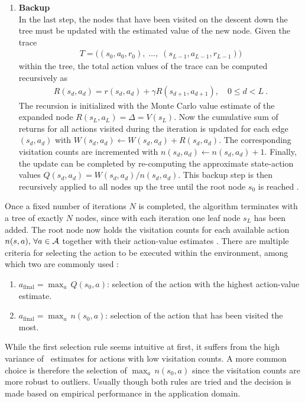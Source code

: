 \begin{enumerate}
    \item \textbf{Backup}\\
    In the last step, the nodes that have been visited on the descent down the tree must be updated with the estimated value of the new node. Given the trace
    \begin{gather}\label{eq:backup_trace}
    T = \big( (s_{0}, a_{0}, r_{0}), \; \ldots, \; (s_{L-1}, a_{L-1}, r_{L-1}) \big)
    \end{gather}
    within the tree, the total action values of the trace can be computed recursively as
    \begin{gather}\label{eq:mcts_trace}
    R(s_d, a_d) = r(s_d, a_d) + \gamma R(s_{d+1}, a_{d+1}), \quad 0 \leq d < L~.
    \end{gather}
    The recursion is initialized with the Monte Carlo value estimate of the expanded node $R(s_L, a_L) = \Delta = V(s_L)$. Now the cumulative sum of returns for all actions visited during the iteration is updated for each edge $(s_d, a_d)$ with $W(s_d, a_d) \leftarrow W(s_d, a_d) + R(s_d, a_d)$. The corresponding visitation counts are incremented with $n(s_d, a_d) \leftarrow n(s_d, a_d) + 1$. Finally, the update can be completed by re-computing the approximate state-action values $Q(s_d, a_d) = W(s_d, a_d)/n(s_d, a_d)$. This backup step is then recursively applied to all nodes up the tree until the root node $s_0$ is reached \cite{browneSurveyMonteCarlo2012, moerlandA0CAlphaZero2018}.
\end{enumerate}

Once a fixed number of iterations $N$ is completed, the algorithm terminates with a tree of exactly $N$ nodes, since with each iteration one leaf node $s_L$ has been added. The root node now holds the visitation counts for each available action $n(s, a), \, \forall \action$ together with their action-value estimates \Q. There are multiple criteria for selecting the action to be executed within the environment, among which two are commonly used \cite{browneSurveyMonteCarlo2012}:
\begin{enumerate}
    \item $a_{\text{final}} = \max_a \, Q(s_0, a)$: selection of the action with the highest action-value estimate.
    \item $a_{\text{final}} = \max_a \, n(s_0, a)$: selection of the action that has been visited the most.
\end{enumerate}
While the first selection rule seems intuitive at first, it suffers from the high variance of \Q\ estimates for actions with low visitation counts. A more common choice is therefore the selection of $\max_a \, n(s_0, a)$ since the visitation counts are more robust to outliers. Usually though both rules are tried and the decision is made based on empirical performance in the application domain.

